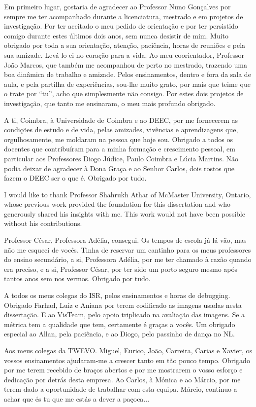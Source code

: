 Em primeiro lugar, gostaria de agradecer ao Professor Nuno Gonçalves por sempre me ter acompanhado durante a licenciatura, mestrado e em projetos de investigação. Por ter aceitado o meu pedido de orientação e por ter persistido comigo durante estes últimos dois anos, sem nunca desistir de mim. Muito obrigado por toda a sua orientação, atenção, paciência, horas de reuniões e pela sua amizade. Levá-lo-ei no coração para a vida. Ao meu coorientador, Professor João Marcos, que também me acompanhou de perto no mestrado, trazendo uma boa dinâmica de trabalho e amizade. Pelos ensinamentos, dentro e fora da sala de aula, e pela partilha de experiências, sou-lhe muito grato, por mais que teime que o trate por ``tu'', acho que simplesmente não consigo. Por estes dois projetos de investigação, que tanto me ensinaram, o meu mais profundo obrigado.

A ti, Coimbra, à Universidade de Coimbra e ao DEEC, por me fornecerem as condições de estudo e de vida, pelas amizades, vivências e aprendizagens que, orgulhosamente, me moldaram na pessoa que hoje sou. Obrigado a todos os docentes que contribuíram para a minha formação e crescimento pessoal, em particular aos Professores Diogo Júdice, Paulo Coimbra e Lúcia Martins. Não podia deixar de agradecer à Dona Graça e ao Senhor Carlos, dois rostos que fazem o DEEC ser o que é. Obrigado por tudo.

I would like to thank Professor Shahrukh Athar of McMaster University, Ontario, whose previous work provided the foundation for this dissertation and who generously shared his insights with me. This work would not have been possible without his contributions.

Professor César, Professora Adélia, consegui. Os tempos de escola já lá vão, mas não me esqueci de vocês. Tinha de reservar um cantinho para os meus professores do ensino secundário, a si, Professora Adélia, por me ter chamado à razão quando era preciso, e a si, Professor César, por ter sido um porto seguro mesmo após tantos anos sem nos vermos. Obrigado por tudo.

A todos os meus colegas do ISR, pelos ensinamentos e horas de debugging. Obrigado Farhad, Luiz e Aniana por terem codificado as imagens usadas nesta dissertação. E ao VisTeam, pelo apoio triplicado na avaliação das imagens. Se a métrica tem a qualidade que tem, certamente é graças a vocês. Um obrigado especial ao Allan, pela paciência, e ao Diogo, pelo passinho de dança no NL.

Aos meus colegas da TWEVO. Miguel, Eurico, João, Carreira, Carias e Xavier, os vossos ensinamentos ajudaram-me a crescer tanto em tão pouco tempo. Obrigado por me terem recebido de braços abertos e por me mostrarem o vosso esforço e dedicação por detrás desta empresa. Ao Carlos, à Mónica e ao Márcio, por me terem dado a oportunidade de trabalhar com esta equipa. Márcio, continuo a achar que és tu que me estás a dever a paçoca...

